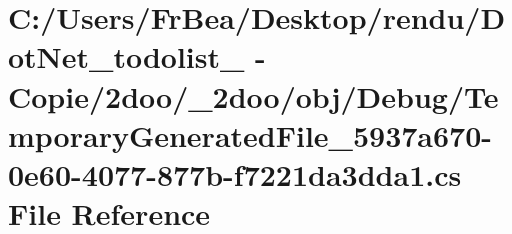 \hypertarget{obj_2_debug_2_temporary_generated_file__5937a670-0e60-4077-877b-f7221da3dda1_8cs}{
\section{C:/Users/FrBea/Desktop/rendu/DotNet\_\-todolist\_ - Copie/2doo/\_\-2doo/obj/Debug/TemporaryGeneratedFile\_\-5937a670-0e60-4077-877b-f7221da3dda1.cs File Reference}
\label{obj_2_debug_2_temporary_generated_file__5937a670-0e60-4077-877b-f7221da3dda1_8cs}
}
